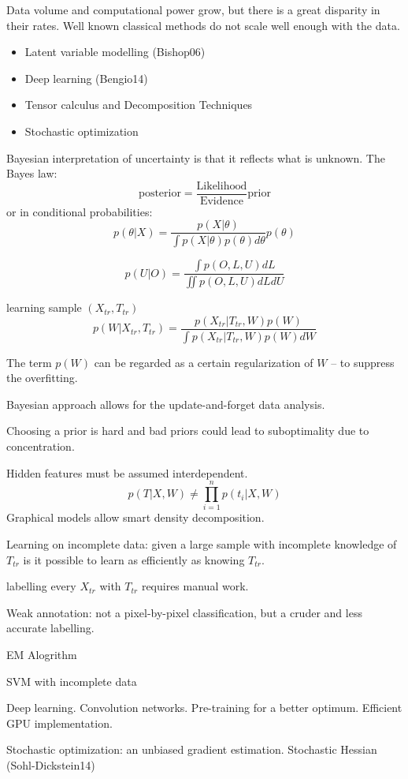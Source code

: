 \documentclass[a4paper]{article}
\newcommand{\brac}[1]{{\left ( #1 \right )}}
\begin{document}
Data volume and computational power grow, but there is a great disparity in their rates.
Well known classical methods do not scale well enough with the data.

\begin{itemize}
	\item Latent variable modelling (Bishop06)
	\item Deep learning (Bengio14)
	\item Tensor calculus and Decomposition Techniques
	\item Stochastic optimization
\end{itemize}

Bayesian interpretation of uncertainty is that it reflects what is unknown. The Bayes law:
\[\text{posterior} = \frac{\text{Likelihood}}{\text{Evidence}} \text{prior}\]
or in conditional probabilities:
\[p(\theta|X) = \frac{p(X|\theta)}{\int p(X|\theta) p(\theta) d\theta }p(\theta)\]

\[p(U|O) = \frac{\int p(O,L,U) dL }{\iint p(O,L,U) dLdU}\]

learning sample $\brac{X_{tr}, T_{tr}}$
\[p(W|X_{tr}, T_{tr}) = \frac{p(X_{tr}|T_{tr},W) p(W)}{\int p(X_{tr}|T_{tr},W) p(W) dW}\]

The term $p(W)$ can be regarded as a certain regularization of $W$ -- to suppress the overfitting.

Bayesian approach allows for the update-and-forget data analysis.

Choosing a prior is hard and bad priors could lead to suboptimality due to concentration.

Hidden features must be assumed interdependent.
\[p(T|X,W) \neq \prod_{i=1}^n p(t_i|X,W)\]
Graphical models allow smart density decomposition.

Learning on incomplete data: given a large sample with incomplete knowledge of $T_{tr}$
is it possible to learn as efficiently as knowing $T_{tr}$.

labelling every $X_{tr}$ with $T_{tr}$ requires manual work.

Weak annotation: not a pixel-by-pixel classification, but a cruder and less accurate labelling.

EM Alogrithm

SVM with incomplete data

Deep learning. Convolution networks. Pre-training for a better optimum. Efficient GPU implementation.

Stochastic optimization: an unbiased gradient estimation. 
Stochastic Hessian (Sohl-Dickstein14)
\end{document}
